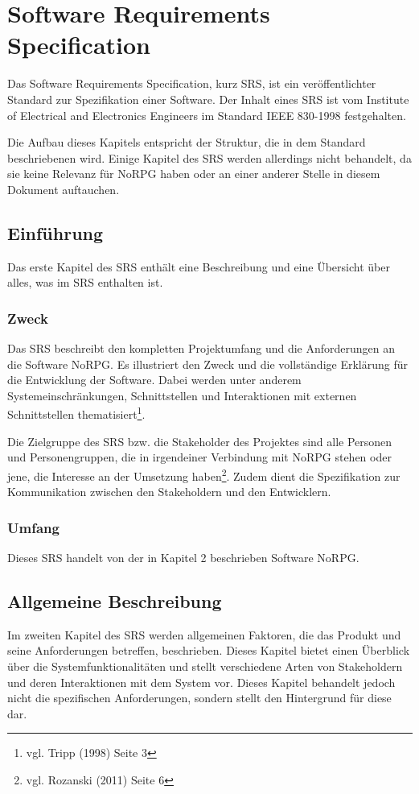 \chapter{Software Requirements Specification}
	Das Software Requirements Specification, kurz SRS, ist ein veröffentlichter Standard zur Spezifikation einer Software. Der Inhalt eines SRS ist vom Institute of Electrical and Electronics Engineers im Standard IEEE 830-1998 festgehalten.
	
	Die Aufbau dieses Kapitels entspricht der Struktur, die in dem Standard beschriebenen wird. Einige Kapitel des SRS werden allerdings nicht behandelt, da sie keine Relevanz für NoRPG haben oder an einer anderer Stelle in diesem Dokument auftauchen.
	
\section{Einführung}
	Das erste Kapitel des SRS enthält eine Beschreibung und eine Übersicht über alles, was im SRS enthalten ist.
	
	\subsection{Zweck}
		Das SRS beschreibt den kompletten Projektumfang und die Anforderungen an die Software NoRPG. Es illustriert den Zweck und die vollständige Erklärung für die Entwicklung der Software. Dabei werden unter anderem Systemeinschränkungen, Schnittstellen und Interaktionen mit externen Schnittstellen thematisiert\footnote{vgl. Tripp \cite{srsIEEE}(1998) Seite 3}. 
	
		Die Zielgruppe des SRS bzw. die Stakeholder des Projektes sind alle Personen und Personengruppen, die in irgendeiner Verbindung mit NoRPG stehen oder jene, die Interesse an der Umsetzung haben\footnote{vgl. Rozanski \cite{rozanski2011}(2011) Seite 6}. Zudem dient die Spezifikation zur Kommunikation zwischen den Stakeholdern und den Entwicklern.
		
	\subsection{Umfang}
		Dieses SRS handelt von der in Kapitel 2 beschrieben Software NoRPG. 
		
\section{Allgemeine Beschreibung}
	Im zweiten Kapitel des SRS werden allgemeinen Faktoren, die das Produkt und seine Anforderungen betreffen, beschrieben. Dieses Kapitel bietet einen Überblick über die Systemfunktionalitäten und stellt verschiedene Arten von Stakeholdern und deren Interaktionen mit dem System vor. Dieses Kapitel behandelt jedoch nicht die spezifischen Anforderungen, sondern stellt den Hintergrund für diese dar. 

